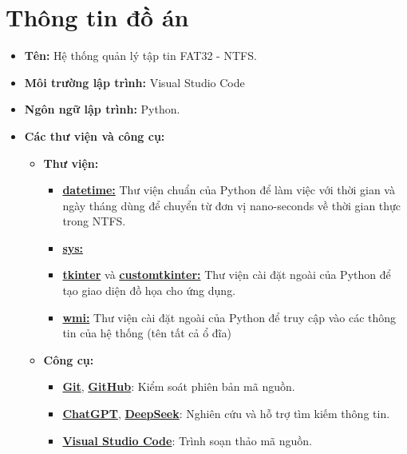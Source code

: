 \section{Thông tin đồ án}
\begin{itemize}
  \item \textbf{Tên:} Hệ thống quản lý tập tin FAT32 - NTFS.
  \item \textbf{Môi trường lập trình:} Visual Studio Code
  \item \textbf{Ngôn ngữ lập trình:} Python.
  \item \textbf{Các thư viện và công cụ:}
        \begin{itemize}
          \item \textbf{Thư viện:}
                \begin{itemize}
                  \item \href{https://docs.python.org/3/library/datetime.html}{\textbf{datetime:}} Thư viện chuẩn của Python để làm việc với thời gian và ngày tháng dùng để chuyển từ đơn vị nano-seconds về thời gian thực trong NTFS.
                  
				  \item \href{https://docs.python.org/3/library/sys.html}{\textbf{sys:}} 
				  
				  \item \href{https://docs.python.org/3/library/tkinter.html}{\textbf{tkinter}} và \href{https://customtkinter.tomschimansky.com/}{\textbf{customtkinter:}} Thư viện cài đặt ngoài của Python để tạo giao diện đồ họa cho ứng dụng.
				  \item \href{https://timgolden.me.uk/python/wmi/tutorial.html}{\textbf{wmi:}} Thư viện cài đặt ngoài của Python để truy cập vào các thông tin của hệ thống (tên tất cả ổ đĩa)
				  
                \end{itemize}
          \item \textbf{Công cụ:}
                \begin{itemize}
                  \item \href{https://git-scm.com/}{\textbf{Git}}, \href{https://github.com/}{\textbf{GitHub}}: Kiểm soát phiên bản mã nguồn.
                  \item \href{https://chatgpt.com/}{\textbf{ChatGPT}}, \href{https://chat.deepseek.com/}{\textbf{DeepSeek}}: Nghiên cứu và hỗ trợ tìm kiếm thông tin.
                  \item \href{https://code.visualstudio.com/}{\textbf{Visual Studio Code}}: Trình soạn thảo mã nguồn.
                \end{itemize}
        \end{itemize}
\end{itemize}
